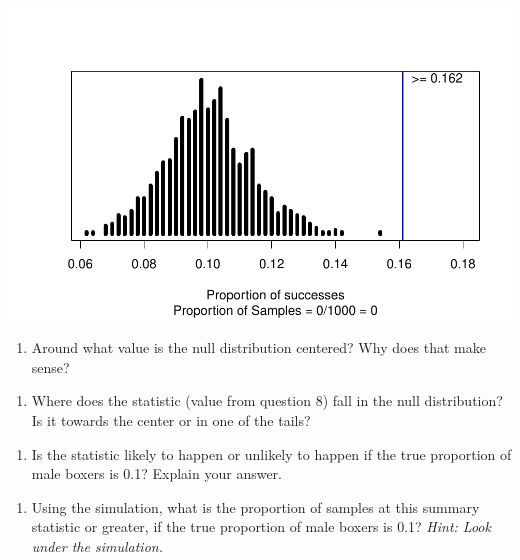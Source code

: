 \documentclass[
]{report}
\providecommand{\tightlist}{%
  \setlength{\itemsep}{0pt}\setlength{\parskip}{0pt}}
\begin{document}
\begin{center}\includegraphics[width=0.7\linewidth]{06-inference-1cat_files/figure-latex/unnamed-chunk-4-1} \end{center}

\begin{enumerate}
\def\labelenumi{\arabic{enumi}.}
\setcounter{enumi}{18}
\tightlist
\item
  Around what value is the null distribution centered? Why does that make sense?
\end{enumerate}

\vspace{1in}

\begin{enumerate}
\def\labelenumi{\arabic{enumi}.}
\setcounter{enumi}{19}
\tightlist
\item
  Where does the statistic (value from question 8) fall in the null distribution? Is it towards the center or in one of the tails?
\end{enumerate}

\vspace{1in}

\begin{enumerate}
\def\labelenumi{\arabic{enumi}.}
\setcounter{enumi}{20}
\tightlist
\item
  Is the statistic likely to happen or unlikely to happen if the true proportion of male boxers is 0.1? Explain your answer.
\end{enumerate}

\vspace{1in}

\begin{enumerate}
\def\labelenumi{\arabic{enumi}.}
\setcounter{enumi}{21}
\tightlist
\item
  Using the simulation, what is the proportion of samples at this summary statistic or greater, if the true proportion of male boxers is 0.1? \emph{Hint: Look under the simulation.}
\end{enumerate}
\end{document}
